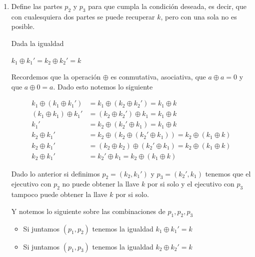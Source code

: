 \documentclass[11pt]{article}
\begin{document}
        \begin{enumerate}[label=\alph*)]
            \item Define las partes $p_2$ y $p_3$ para que cumpla la condición deseada, es decir, que con cualesquiera dos partes se puede recuperar $k$, pero con una sola no es posible.
            
            Dada la igualdad
            
            \begin{center}
                $k_1 \oplus k_{1}' = k_2 \oplus k_{2}' = k$
            \end{center}
            
            Recordemos que la operación $\oplus$ es conmutativa, asociativa, que $a \oplus a = 0$ y que $a \oplus 0 = a$. Dado esto 
            notemos lo siguiente
            
            \begin{align*}
                k_1 \oplus (k_1 \oplus k_{1}') &= k_1 \oplus (k_2 \oplus k_{2}') = k_1 \oplus k \\
                (k_1 \oplus k_1) \oplus k_{1}' &= (k_2 \oplus k_{2}') \oplus k_1 = k_1 \oplus k \\
                k_{1}' & = k_2 \oplus (k_{2}' \oplus k_1) = k_1 \oplus k \\
                k_2 \oplus k_{1}' & = k_2 \oplus (k_2 \oplus (k_{2}' \oplus k_1)) = k_2 \oplus (k_1 \oplus k) \\
                k_2 \oplus k_{1}' & = (k_2 \oplus k_2) \oplus (k_{2}' \oplus k_1) = k_2 \oplus (k_1 \oplus k) \\
                k_2 \oplus k_{1}' & = k_{2}' \oplus k_1 = k_2 \oplus (k_1 \oplus k)
            \end{align*}
            
            Dado lo anterior si definimos $p_2 = (k_2, k_{1}')$ y $p_3 = (k_{2}', k_1)$ tenemos que el ejecutivo con $p_2$ no puede obtener la llave $k$ por si solo y el ejecutivo con $p_3$ tampoco puede obtener la llave $k$ por si solo.
            
            Y notemos lo siguiente sobre las combinaciones de $p_1, p_2, p_3$
            
            \begin{itemize}
                \item Si juntamos $(p_1, p_2)$ tenemos la igualdad $k_1 \oplus k_{1}' = k$
                
                \item Si juntamos $(p_1, p_3)$ tenemos la igualdad $k_2 \oplus k_{2}' = k$
                

\end{itemize}
\end{enumerate}
\end{document}
